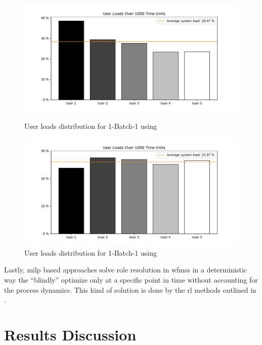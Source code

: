 \begin{figure}[!ht]
	\centering
	\begin{minipage}[b]{0.45\textwidth}
		\includegraphics[width=\textwidth]{img/1_BATCHONE_MSA_NU5_GI3_SIM1000_FAIR}
		\caption{User loads distribution for 1-Batch-1 using }
		\label{fig:msa_fairness}
	\end{minipage}
	\hfill
	\begin{minipage}[b]{0.45\textwidth}
		\includegraphics[width=\textwidth]{img/1_BATCHONE_ST_NU5_GI3_SIM1000_FAIR}
		\caption{User loads distribution for 1-Batch-1 using }
		\label{fig:st_fairness}
	\end{minipage}
\end{figure}

Lastly, \gls{milp} based approaches solve role resolution in \glspl{wfms} in a deterministic way \ie the ``blindly'' optimize only at a specific point in time without accounting for the process dynamics. This kind of solution is done by the \gls{rl} methods outlined in .

\section{ Results Discussion}
\label{sec:rl_discussion}


